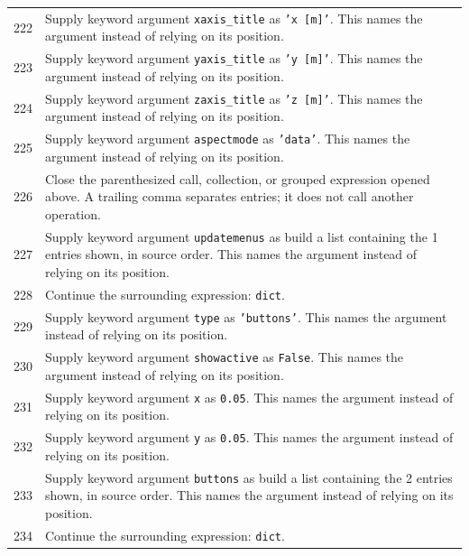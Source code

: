 \documentclass[11pt,a4paper]{book}
\begin{document}
\begin{longtable}{r p{}}
222 & Supply keyword argument \texttt{xaxis\_title} as \texttt{'x [m]'}. This names the argument instead of relying on its position. \\

223 & Supply keyword argument \texttt{yaxis\_title} as \texttt{'y [m]'}. This names the argument instead of relying on its position. \\

224 & Supply keyword argument \texttt{zaxis\_title} as \texttt{'z [m]'}. This names the argument instead of relying on its position. \\

225 & Supply keyword argument \texttt{aspectmode} as \texttt{'data'}. This names the argument instead of relying on its position. \\

226 & Close the parenthesized call, collection, or grouped expression opened above. A trailing comma separates entries; it does not call another operation. \\

227 & Supply keyword argument \texttt{updatemenus} as build a list containing the 1 entries shown, in source order. This names the argument instead of relying on its position. \\

228 & Continue the surrounding expression: \texttt{dict}. \\

229 & Supply keyword argument \texttt{type} as \texttt{'buttons'}. This names the argument instead of relying on its position. \\

230 & Supply keyword argument \texttt{showactive} as \texttt{False}. This names the argument instead of relying on its position. \\

231 & Supply keyword argument \texttt{x} as \texttt{0.05}. This names the argument instead of relying on its position. \\

232 & Supply keyword argument \texttt{y} as \texttt{0.05}. This names the argument instead of relying on its position. \\

233 & Supply keyword argument \texttt{buttons} as build a list containing the 2 entries shown, in source order. This names the argument instead of relying on its position. \\

234 & Continue the surrounding expression: \texttt{dict}. \\


\end{longtable}
\end{document}
